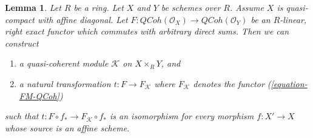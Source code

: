 \documentclass{stacks-project}
\theoremstyle{plain}
\newtheorem{lemma}[subsection]{Lemma}
\theoremstyle{definition}
\theoremstyle{remark}
\numberwithin{equation}{subsection}
\def\QCoh{\mathit{QCoh}}
\begin{document}
\begin{lemma}
\label{lemma-functor-quasi-coherent-from-affine-diagonal-pre}
Let $R$ be a ring. Let $X$ and $Y$ be schemes over $R$. Assume $X$
is quasi-compact with affine diagonal. Let
$F : \QCoh(\mathcal{O}_X) \to \QCoh(\mathcal{O}_Y)$
be an $R$-linear, right exact functor which commutes
with arbitrary direct sums. Then we can construct
\begin{enumerate}
\item a quasi-coherent module $\mathcal{K}$ on $X \times_R Y$, and
\item a natural transformation $t : F \to F_\mathcal{K}$
where $F_\mathcal{K}$ denotes the functor (\ref{equation-FM-QCoh})
\end{enumerate}
such that $t : F \circ f_* \to F_\mathcal{K} \circ f_*$ is an isomorphism
for every morphism $f : X' \to X$ whose source is an affine scheme.
\end{lemma}
\end{document}
